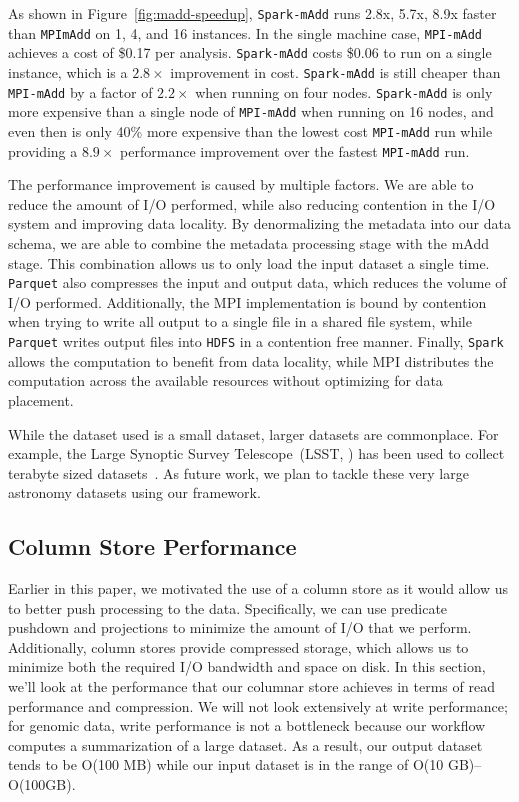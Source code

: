 \documentclass{acm_proc_article-sp}
\begin{document}
As shown in Figure~\ref{fig:madd-speedup}, \texttt{Spark-mAdd} runs 2.8x, 5.7x, 8.9x faster than
\texttt{MPImAdd} on 1, 4, and 16 instances. In the single machine case, \texttt{MPI-mAdd} achieves a cost of \$0.17 per
analysis. \texttt{Spark-mAdd} costs \$0.06 to run on a single instance, which is a $2.8\times$ improvement in
cost. \texttt{Spark-mAdd} is still cheaper than \texttt{MPI-mAdd} by a factor of $2.2\times$ when running on four
nodes. \texttt{Spark-mAdd} is only more expensive than a single node of \texttt{MPI-mAdd} when running on 16
nodes, and even then is only 40\% more expensive than the lowest cost \texttt{MPI-mAdd} run while providing a
$8.9\times$ performance improvement over the fastest \texttt{MPI-mAdd} run.

The performance improvement is caused by multiple factors. We are able to reduce the amount of I/O performed,
while also reducing contention in the I/O system and improving data locality. By denormalizing the metadata into
our data schema, we are able to combine the metadata processing stage with the mAdd stage. This combination
allows us to only load the input dataset a single time. \texttt{Parquet} also compresses the input and output data, which
reduces the volume of I/O performed. Additionally, the MPI implementation is bound by contention when trying to write
all output to a single file in a shared file system, while \texttt{Parquet} writes output files into \texttt{HDFS} in a
contention free manner. Finally, \texttt{Spark} allows the computation to benefit from data locality, while MPI distributes
the computation across the available resources without optimizing for data placement.

While the dataset used is a small dataset, larger datasets are commonplace. For example, the Large Synoptic
Survey Telescope~(LSST, \cite{lsst2008}) has been used to collect terabyte sized datasets~\cite{moyers13}. As
future work, we plan to tackle these very large astronomy datasets using our framework.

\subsection{Column Store Performance}
\label{sec:column-store-perf}

Earlier in this paper, we motivated the use of a column store as it would allow us to better push processing to
the data. Specifically, we can use predicate pushdown and projections to minimize the amount of I/O that we
perform. Additionally, column stores provide compressed storage, which allows us to minimize both the required
I/O bandwidth and space on disk. In this section, we'll look at the performance that our columnar store achieves
in terms of read performance and compression. We will not look extensively at write performance; for genomic
data, write performance is not a bottleneck because our workflow computes a summarization of a large
dataset. As a result, our output dataset tends to be O(100 MB) while our input dataset is in the range of
O(10 GB)--O(100GB).
\end{document}
